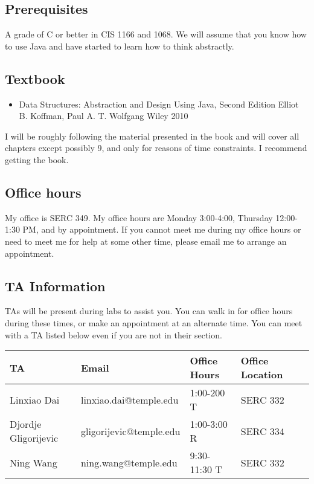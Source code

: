\documentclass[10pt, letter]{article}
\begin{document}
\subsection*{Prerequisites}
A grade of C or better in CIS 1166 and 1068.
We will assume that you know how to use Java and have started to learn how to think abstractly.




\subsection*{Textbook}
\begin{itemize}
	\item Data Structures: Abstraction and Design Using Java, Second Edition Elliot B. Koffman, Paul A. T. Wolfgang Wiley 2010
\end{itemize}

I will be roughly following the material presented in the book and will cover all chapters except possibly 9, and only for reasons of time constraints.
I recommend getting the book.

\subsection*{Office hours}
My office is SERC 349.
My office hours are Monday 3:00-4:00, Thursday 12:00-1:30 PM, and by appointment.
If you cannot meet me during my office hours or need to meet me for help at some other time, please email me to arrange an appointment. 

\subsection*{TA Information}

TAs will be present during labs to assist you.
You can walk in for office hours during these times, or make an appointment at an alternate time.
You can meet with a TA listed below even if you are not in their section.

{\footnotesize
	\begin{tabular}{l l l l l}
		TA & Email &Office Hours & Office Location \\ \hline
		Linxiao Dai & linxiao.dai@temple.edu & 1:00-200 T & SERC 332 \\
		Djordje Gligorijevic & gligorijevic@temple.edu & 1:00-3:00 R & SERC 334\\
		Ning Wang & ning.wang@temple.edu & 9:30-11:30 T & SERC 332\\
	\end{tabular}
}
\end{document}
